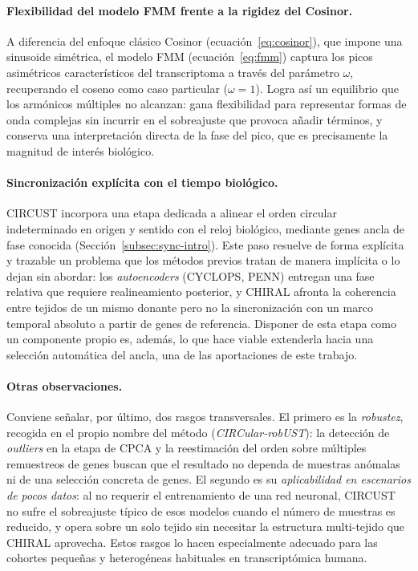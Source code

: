 \documentclass[12pt, a4paper]{report}
\begin{document}
\paragraph{Flexibilidad del modelo FMM frente a la rigidez del Cosinor.} A diferencia del enfoque clásico Cosinor (ecuación~\eqref{eq:cosinor}), que impone una sinusoide simétrica, el modelo FMM (ecuación~\eqref{eq:fmm}) captura los picos asimétricos característicos del transcriptoma a través del parámetro $\omega$, recuperando el coseno como caso particular ($\omega=1$). Logra así un equilibrio que los armónicos múltiples no alcanzan: gana flexibilidad para representar formas de onda complejas sin incurrir en el sobreajuste que provoca añadir términos, y conserva una interpretación directa de la fase del pico, que es precisamente la magnitud de interés biológico.

\paragraph{Sincronización explícita con el tiempo biológico.} CIRCUST incorpora una etapa dedicada a alinear el orden circular indeterminado en origen y sentido con el reloj biológico, mediante genes ancla de fase conocida (Sección~\ref{subsec:sync-intro}). Este paso resuelve de forma explícita y trazable un problema que los métodos previos tratan de manera implícita o lo dejan sin abordar: los \textit{autoencoders} (CYCLOPS, PENN) entregan una fase relativa que requiere realineamiento posterior, y CHIRAL afronta la coherencia entre tejidos de un mismo donante pero no la sincronización con un marco temporal absoluto a partir de genes de referencia. Disponer de esta etapa como un componente propio es, además, lo que hace viable extenderla hacia una selección automática del ancla, una de las aportaciones de este trabajo.

\paragraph{Otras observaciones.} Conviene señalar, por último, dos rasgos transversales. El primero es la \emph{robustez}, recogida en el propio nombre del método (\textit{CIRCular-robUST}): la detección de \textit{outliers} en la etapa de CPCA y la reestimación del orden sobre múltiples remuestreos de genes buscan que el resultado no dependa de muestras anómalas ni de una selección concreta de genes. El segundo es su \emph{aplicabilidad en escenarios de pocos datos}: al no requerir el entrenamiento de una red neuronal, CIRCUST no sufre el sobreajuste típico de esos modelos cuando el número de muestras es reducido, y opera sobre un solo tejido sin necesitar la estructura multi-tejido que CHIRAL aprovecha. Estos rasgos lo hacen especialmente adecuado para las cohortes pequeñas y heterogéneas habituales en transcriptómica humana.
\end{document}
